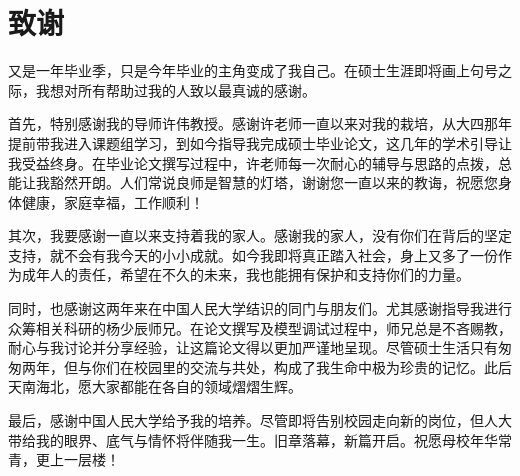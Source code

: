 \newpage
{}
\section*{致谢}

又是一年毕业季，只是今年毕业的主角变成了我自己。在硕士生涯即将画上句号之际，我想对所有帮助过我的人致以最真诚的感谢。

首先，特别感谢我的导师许伟教授。感谢许老师一直以来对我的栽培，从大四那年提前带我进入课题组学习，到如今指导我完成硕士毕业论文，这几年的学术引导让我受益终身。在毕业论文撰写过程中，许老师每一次耐心的辅导与思路的点拨，总能让我豁然开朗。人们常说良师是智慧的灯塔，谢谢您一直以来的教诲，祝愿您身体健康，家庭幸福，工作顺利！

其次，我要感谢一直以来支持着我的家人。感谢我的家人，没有你们在背后的坚定支持，就不会有我今天的小小成就。如今我即将真正踏入社会，身上又多了一份作为成年人的责任，希望在不久的未来，我也能拥有保护和支持你们的力量。

同时，也感谢这两年来在中国人民大学结识的同门与朋友们。尤其感谢指导我进行众筹相关科研的杨少辰师兄。在论文撰写及模型调试过程中，师兄总是不吝赐教，耐心与我讨论并分享经验，让这篇论文得以更加严谨地呈现。尽管硕士生活只有匆匆两年，但与你们在校园里的交流与共处，构成了我生命中极为珍贵的记忆。此后天南海北，愿大家都能在各自的领域熠熠生辉。

最后，感谢中国人民大学给予我的培养。尽管即将告别校园走向新的岗位，但人大带给我的眼界、底气与情怀将伴随我一生。旧章落幕，新篇开启。祝愿母校年华常青，更上一层楼！
